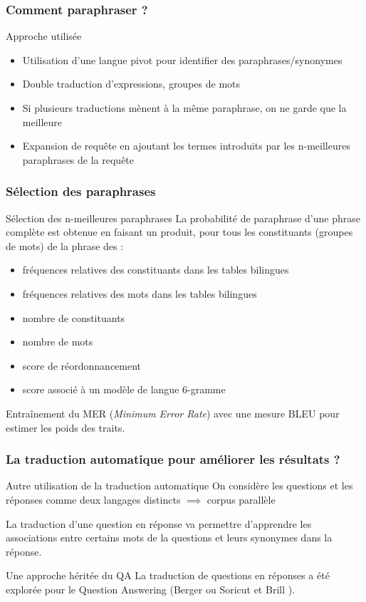 \documentclass[10pt]{beamer}
\begin{document}
\begin{frame}
  \frametitle{Comment paraphraser ?}
  \begin{block}{Approche utilisée}
  \begin{itemize}
    \item Utilisation d'une langue pivot pour identifier des paraphrases/synonymes
    \item Double traduction d'expressions, groupes de mots
    \item Si plusieurs traductions mènent à la même paraphrase, on ne garde que la meilleure
    \item Expansion de requête en ajoutant les termes introduits par les n-meilleures paraphrases de la requête
  \end{itemize}
  \end{block}
\end{frame}

\begin{frame}
  \frametitle{Sélection des paraphrases}
  \begin{block}{Sélection des n-meilleures paraphrases}
  La probabilité de paraphrase d'une phrase complète est obtenue en faisant un produit, pour tous les constituants (groupes de mots) de la phrase des :
  \begin{itemize}
    \item fréquences relatives des constituants dans les tables bilingues
    \item fréquences relatives des mots dans les tables bilingues
    \item nombre de constituants
    \item nombre de mots
    \item score de réordonnancement
    \item score associé à un modèle de langue 6-gramme
  \end{itemize}
  Entra\^inement du MER (\textit{Minimum Error Rate}) avec une mesure BLEU pour estimer les poids des traits.
  \end{block}
\end{frame}

\begin{frame}
  \frametitle{La traduction automatique pour améliorer les résultats
    ?}
  \begin{block}{Autre utilisation de la traduction automatique}
  On considère les questions et les réponses comme deux langages distincts $\implies$ corpus parallèle
  
  La traduction d'une question en réponse va permettre d'apprendre les associations entre certains mots de la questions et leurs synonymes dans la réponse.
  \end{block}
  \pause

  \begin{block}{Une approche héritée du QA}
    La traduction de questions en réponses a été explorée pour le
    Question Answering (Berger \cite{Berger00} ou Soricut et Brill
    \cite{Soricut06}).
  \end{block}

\end{frame}
\end{document}
